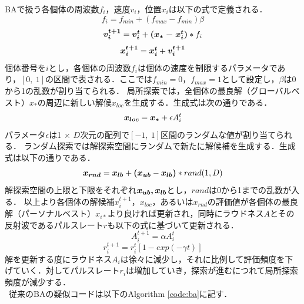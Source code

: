 \documentclass[a4j,11pt]{jarticle}
\begin{document}
BAで扱う各個体の周波数$f_i$，速度$v_i$，位置$x_i$は以下の式で定義される．
\begin{equation}
f_{i} =f_{min}+(f_{max}-f_{min}) \beta
\label{eq:freq} 
\end{equation}
\begin{equation}
\mbox{\boldmath $v_i^{t+1}$}=\mbox{\boldmath $v_i^{t}$}+\mbox{\boldmath $(x_*-x_i^t)$}* f_i
\label{eq:vi}
\end{equation}
\begin{equation}
\mbox{\boldmath $x_i^{t+1}$}=\mbox{\boldmath $x_i^{t}$}+\mbox{\boldmath $v_i^{t+1}$}
\label{eq:xi}
\end{equation}
個体番号を$i$とし，各個体の周波数${f_i}$は個体の速度を制限するパラメータであり，$[0, \ 1]$の区間で表される．ここでは${f_{min}=0}$，${f_{max}=1}$として設定し，$\beta$は0から1の乱数が割り当てられる．
局所探索では，全個体の最良解（グローバルベスト）$x_*$の周辺に新しい解候${x_{loc}}$を生成する．生成式は次の通りである．
\begin{equation}
\label{eq:loc}
\mbox{\boldmath $x_{loc}$}=\mbox{\boldmath $x_*$} + \epsilon A_i^t
\end{equation}
パラメータ$\epsilon$は1 $\times$ $D$次元の配列で$[-1, \ 1]$区間のランダムな値が割り当てられる． ランダム探索では解探索空間にランダムで新たに解候補を生成する．生成式は以下の通りである．
\begin{equation}
\label{eq:rnd}
\mbox{\boldmath $x_{rnd}$}=\mbox{\boldmath $x_{lb}$} + \mbox{\boldmath $(x_{ub}$} - \mbox{\boldmath $x_{lb})$}*rand(1,D)
\end{equation}
解探索空間の上限と下限をそれぞれ$\mbox{\boldmath $x_{ub}, x_{lb}$}$とし，$rand$は0から1までの乱数が入る．
以上より各個体の解候補${x_i^{t+1}}$，${x_{loc}}$，あるいは$x_{rnd}$の評価値が各個体の最良解（パーソナルベスト）$x_{i*}$より良ければ更新され，同時にラウドネス$A$とその反射波であるパルスレート$r$も以下の式に基づいて更新される．
\begin{equation}
\label{eq:loud}
A_i^{t+1}= \alpha A_i^t
\end{equation}
\begin{equation}
\label{eq:pulse}
r_i^{t+1}=r_i^t[1-exp(- \gamma t)]
\end{equation}
解を更新する度にラウドネス$A_i$は徐々に減少し，それに比例して評価頻度を下げていく．対してパルスレート$r_i$は増加していき，探索が進むにつれて局所探索頻度が減少する．\\ \
従来のBAの疑似コードは以下のAlgorithm \ref{code:ba}に記す．
\end{document}

